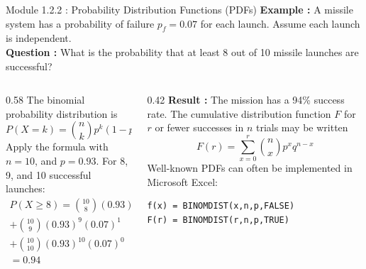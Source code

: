 \documentclass{beamer}
\begin{document}
\begin{frame}[fragile]{Module 1.2.2 : Probability Distribution Functions (PDFs)}
\scriptsize
\textbf{Example : } A missile system has a probability of failure $p_f=0.07$ for each launch. Assume each launch is independent. \\ \vspace{0.25cm}
\textbf{Question : }
What is the probability that at least 8 out of 10 missile launches are successful? \\ \vspace{0.5cm}
\begin{columns}
\begin{column}{0.58\textwidth}
\scriptsize
The binomial probability distribution is
\begin{equation}
P(X=k)=
\binom{n}{k}
p^k(1-p)^{n-k},
\end{equation}
Apply the formula with $n=10$, and $p=0.93$.  For 8, 9, and 10 successful launches:
\begin{multline}
P(X\geq 8) = \binom{10}{8}(0.93)^8(0.07)^2 \\ + \binom{10}{9}(0.93)^9(0.07)^1 \\ + \binom{10}{10}(0.93)^10(0.07)^0 \\ = 0.94
\end{multline}
\end{column}
\begin{column}{0.42\textwidth}
\textbf{Result : } The mission has a 94\% success rate.  The cumulative distribution function $F$ for $r$ or fewer successes in $n$ trials may be written
\begin{equation}
F(r) = \sum_{x=0}^r \binom{n}{x} p^x q^{n-x}
\end{equation}
Well-known PDFs can often be implemented in Microsoft Excel:
\begin{verbatim}
f(x) = BINOMDIST(x,n,p,FALSE)
F(r) = BINOMDIST(r,n,p,TRUE)
\end{verbatim}
\end{column}
\end{columns}
\end{frame}
\end{document}
